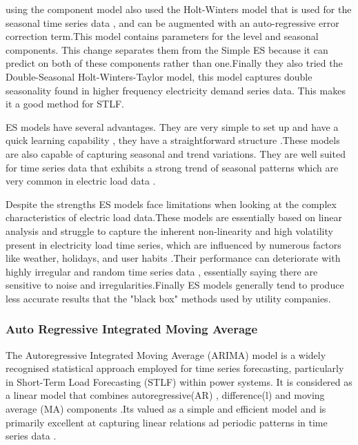  \cite{rendon2019structural} using the component model also used the Holt-Winters model that is used for the seasonal time series data  , and can be augmented with an auto-regressive error correction term.This model contains parameters for the level and seasonal components. This change separates them from the Simple ES because it can predict on both of these components rather than one.Finally they also tried the Double-Seasonal Holt-Winters-Taylor model, this model captures double seasonality found in higher frequency electricity demand series data. This makes it a good method for STLF.

 ES models have several advantages. They are very simple to set up and have a quick learning capability  , they have a straightforward structure \cite{tshipata2024multi}.These models are also capable of capturing seasonal and trend variations. They are well suited for time series data that exhibits a strong trend of seasonal patterns which are very common in electric load data \cite{ramos2015performance}.
 
Despite the strengths ES models face limitations when looking at the complex characteristics of electric load data.These models are essentially based on linear analysis and struggle to capture the inherent non-linearity and high volatility present in electricity load time series, which are influenced by numerous factors like weather, holidays, and user habits \cite{tshipata2024multi}.Their performance can deteriorate with highly irregular and random time series data \cite{wang2019novel} , essentially saying there are sensitive to noise and irregularities.Finally ES models generally tend to produce less accurate results that the "black box" methods used by utility companies\cite{takeda2016using}.
 
 \subsubsection{Auto Regressive Integrated Moving Average}
 The Autoregressive Integrated Moving Average (ARIMA) model is a widely recognised statistical approach employed for time series forecasting, particularly in Short-Term Load Forecasting (STLF) within power systems. It is considered as a linear model that combines autoregressive(AR)  , difference(l) and moving average (MA) components \cite{revathi2025short}.Its valued as a simple and efficient model   and is primarily excellent at capturing linear relations ad periodic patterns in time series data \cite{ramos2015performance}.
 
